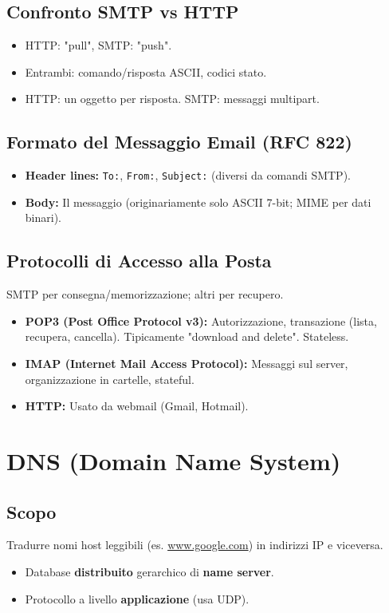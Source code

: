 \documentclass{article}
\begin{document}
\subsection{Confronto SMTP vs HTTP}
\begin{itemize}
    \item HTTP: "pull", SMTP: "push".
    \item Entrambi: comando/risposta ASCII, codici stato.
    \item HTTP: un oggetto per risposta. SMTP: messaggi multipart.
\end{itemize}

\subsection{Formato del Messaggio Email (RFC 822)}
\begin{itemize}
    \item \textbf{Header lines:} \texttt{To:}, \texttt{From:}, \texttt{Subject:} (diversi da comandi SMTP).
    \item \textbf{Body:} Il messaggio (originariamente solo ASCII 7-bit; MIME per dati binari).
\end{itemize}

\subsection{Protocolli di Accesso alla Posta}
SMTP per consegna/memorizzazione; altri per recupero.
\begin{itemize}
    \item \textbf{POP3 (Post Office Protocol v3):} Autorizzazione, transazione (lista, recupera, cancella). Tipicamente "download and delete". Stateless.
    \item \textbf{IMAP (Internet Mail Access Protocol):} Messaggi sul server, organizzazione in cartelle, stateful.
    \item \textbf{HTTP:} Usato da webmail (Gmail, Hotmail).
\end{itemize}


\section{DNS (Domain Name System)}
\subsection{Scopo}
Tradurre nomi host leggibili (es. \url{www.google.com}) in indirizzi IP e viceversa.
\begin{itemize}
    \item Database \textbf{distribuito} gerarchico di \textbf{name server}.
    \item Protocollo a livello \textbf{applicazione} (usa UDP).
\end{itemize}
\end{document}
